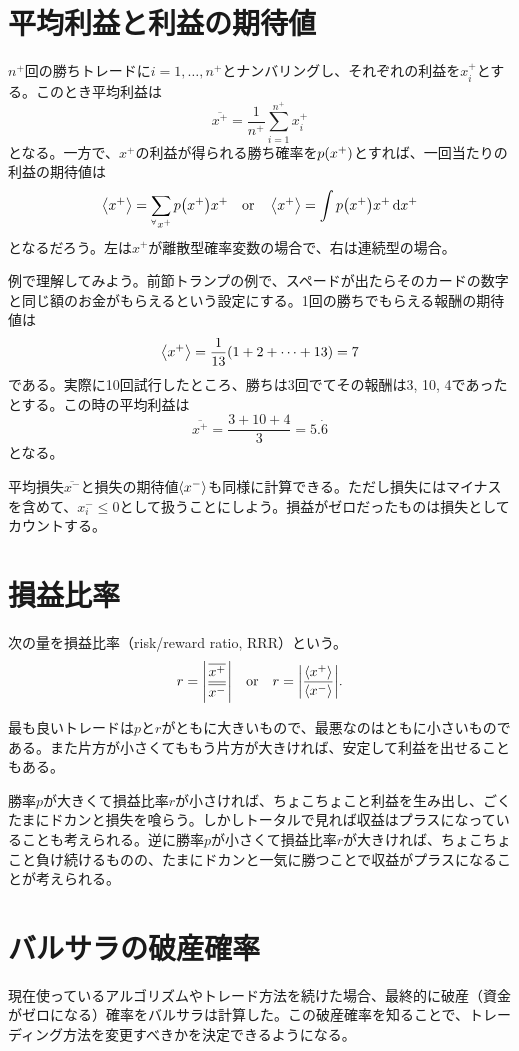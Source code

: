 \documentclass[twoside,openright,a4paper,papersize,uplatex,dvipdfmx]{jsarticle}
\newcommand{\rrr}{r} %
\begin{document}
  \section{平均利益と利益の期待値} \label{sec: 平均利益と利益の期待値}
  $n^{+}$回の勝ちトレードに$i = 1, \ldots, n^{+}$とナンバリングし、それぞれの利益を$x_{i}^{+}$とする。このとき平均利益は
  \[
    \overline{ x^{+} } = \frac{1}{ n^{+} } \sum_{i = 1}^{ n^{+} } x_{i}^{+}
  \]
  となる。一方で、$x^{+}$の利益が得られる勝ち確率を$p \qty( x^{+} )$とすれば、一回当たりの利益の期待値は
  \[
    \expval{ x^{+} } = \sum_{ ^{\forall} x^{+}} p \qty( x^{+} ) x^{+}
    \qq{or}
    \expval{ x^{+} } = \int p \qty( x^{+} )  x^{+} \dd{ x^{+} }
  \]
  となるだろう。左は$x^{+}$が離散型確率変数の場合で、右は連続型の場合。

  例で理解してみよう。前節トランプの例で、スペードが出たらそのカードの数字と同じ額のお金がもらえるという設定にする。1回の勝ちでもらえる報酬の期待値は
  \[
    \expval{ x^{+} } = \frac{1}{13} \qty( 1 + 2 + \cdots + 13 ) = 7
  \]
  である。実際に10回試行したところ、勝ちは3回でてその報酬は3, 10, 4であったとする。この時の平均利益は
  \[
    \overline{ x^{+} } = \frac{3 + 10 + 4}{3} = 5.\dot{6}
  \]
  となる。

  平均損失$\overline{ x^{-} }$と損失の期待値$\expval{ x^{-} }$も同様に計算できる。ただし損失にはマイナスを含めて、$x_{i}^{-} \le 0$として扱うことにしよう。損益がゼロだったものは損失としてカウントする。

  \section{損益比率} \label{sec: 損益比率}
  次の量を損益比率（risk/reward ratio, RRR）という。
  \[
    \rrr = \abs{
      \frac{ \overline{ x^{+} } }{\overline{ x^{-} }}
    }
    \qq{or}
    \rrr = \abs{
      \frac{ \expval{ x^{+} } }{\expval{ x^{-} }}
    }.
  \]

  最も良いトレードは$p$と$\rrr$がともに大きいもので、最悪なのはともに小さいものである。また片方が小さくてももう片方が大きければ、安定して利益を出せることもある。

  勝率$p$が大きくて損益比率$\rrr$が小さければ、ちょこちょこと利益を生み出し、ごくたまにドカンと損失を喰らう。しかしトータルで見れば収益はプラスになっていることも考えられる。逆に勝率$p$が小さくて損益比率$\rrr$が大きければ、ちょこちょこと負け続けるものの、たまにドカンと一気に勝つことで収益がプラスになることが考えられる。

  \section{バルサラの破産確率} \label{sec: バルサラの破産確率}
  現在使っているアルゴリズムやトレード方法を続けた場合、最終的に破産（資金がゼロになる）確率をバルサラは計算した。この破産確率を知ることで、トレーディング方法を変更すべきかを決定できるようになる。
\end{document}
